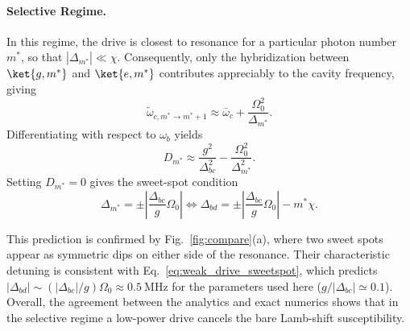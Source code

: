 \paragraph{Selective Regime.}
In this regime, the drive is closest to resonance for a particular photon number \(m^\ast\), so that \(|\Delta_{m^\ast}|\ll \chi\).
Consequently, only the hybridization between \(\ket{g,m^\ast}\) and \(\ket{e,m^\ast}\) contributes appreciably to the cavity frequency, giving
\begin{equation}
\widetilde{\omega}_{c,m^\ast\rightarrow m^\ast+1}
\approx
\bar{\omega}_c+\frac{\Omega_0^2}{\Delta_{m^\ast}}.
\end{equation}
Differentiating with respect to \(\omega_b\) yields
\begin{equation}
\label{eq:Dm_selective}
D_{m^\ast}
\approx
\frac{g^2}{\Delta_{bc}^2}
-\frac{\Omega_0^2}{\Delta_{m^\ast}^2}.
\end{equation}
Setting \(D_{m^\ast}=0\) gives the sweet-spot condition
\begin{equation}
\label{eq:weak_drive_sweetspot}
\Delta_{m^\ast}=\pm \left|\frac{\Delta_{bc}}{g}\Omega_0\right|
\Longleftrightarrow
\Delta_{bd}=\pm \left|\frac{\Delta_{bc}}{g}\Omega_0\right|-m^\ast\chi .
\end{equation}

This prediction is confirmed by Fig.~\ref{fig:compare}(a), where two sweet spots appear as symmetric dips on either side of the resonance.
Their characteristic detuning is consistent with Eq.~\eqref{eq:weak_drive_sweetspot}, which predicts
\(|\Delta_{bd}|\sim (|\Delta_{bc}|/g)\Omega_0\approx 0.5~\mathrm{MHz}\) for the parameters used here (\(g/|\Delta_{bc}|\simeq 0.1\)).
Overall, the agreement between the analytics and exact numerics shows that in the selective regime a low-power drive cancels the bare Lamb-shift susceptibility.


